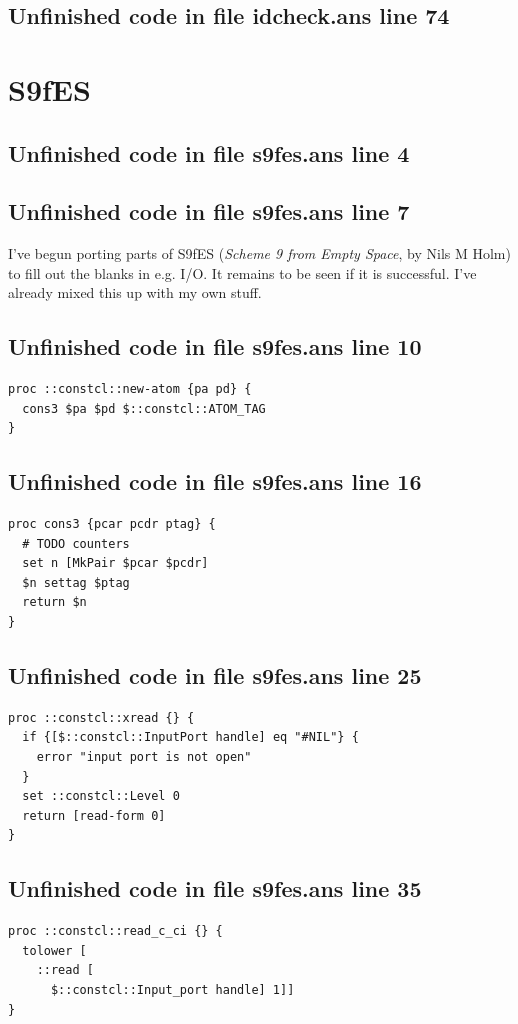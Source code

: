 \documentclass[twoside,9pt]{report}
\begin{document}
\section{Unfinished code in file idcheck.ans line 74}
\chapter{S9fES}
\label{s9fes}
\section{Unfinished code in file s9fes.ans line 4}

\section{Unfinished code in file s9fes.ans line 7}

I've begun porting parts of S9fES (\emph{Scheme 9 from Empty Space}, by Nils M Holm) to fill out the blanks in e.g. I/O. It remains to be seen if it is successful. I've already mixed this up with my own stuff.

\section{Unfinished code in file s9fes.ans line 10}
\begin{lstlisting}
proc ::constcl::new-atom {pa pd} {
  cons3 $pa $pd $::constcl::ATOM_TAG
}
\end{lstlisting}
\section{Unfinished code in file s9fes.ans line 16}
\begin{lstlisting}
proc cons3 {pcar pcdr ptag} {
  # TODO counters
  set n [MkPair $pcar $pcdr]
  $n settag $ptag
  return $n
}
\end{lstlisting}
\section{Unfinished code in file s9fes.ans line 25}
\begin{lstlisting}
proc ::constcl::xread {} {
  if {[$::constcl::InputPort handle] eq "#NIL"} {
    error "input port is not open"
  }
  set ::constcl::Level 0
  return [read-form 0]
}
\end{lstlisting}
\section{Unfinished code in file s9fes.ans line 35}
\begin{lstlisting}
proc ::constcl::read_c_ci {} {
  tolower [
    ::read [
      $::constcl::Input_port handle] 1]]
}
\end{lstlisting}
\end{document}
